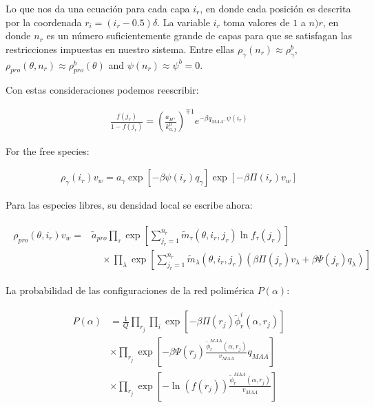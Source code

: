 Lo que nos da una ecuaci\'on para cada capa $i_r$, en donde cada posici\'on es descrita por la coordenada $r_i = (i_r -0.5)\delta$. 
La variable $i_r$ toma valores de $1$ a $n)r$, en donde $n_r$ es un n\'umero suficientemente grande de capas para que se satisfagan las restricciones impuestas en nuestro sistema. Entre ellas
 $\rho_\gamma(n_r) \approx \rho_\gamma^b$, $\rho_{pro}(\theta,n_r) \approx \rho_{pro}^b(\theta)$ and $\psi(n_r) \approx \psi^b = 0$.

Con estas consideraciones podemos reescribir:


\begin{align}
	\frac{f(j_r)}{1-f(j_r)}= \left(\frac{a_{H^+}}{k^0_{a,j}}\right)^{\mp 1} e^{-\beta q_{MAA^-}\psi(i_r)}
\end{align}


For the free species:

\begin{align}
	\rho_\gamma(i_r)v_w = a_\gamma \exp{[-\beta \psi(i_r)q_\gamma]} \exp{[-\beta\Pi(i_r) v_w]}
\end{align}

Para las especies libres, su densidad local se escribe ahora:

\begin{align}
	\begin{aligned}
		\rho_{pro}(\theta, i_r)v_w = &\tilde{a}_{pro} \prod_\tau\exp\left[ \sum^{n_r}_{j_r = 1} \tilde{m}_\tau(\theta,i_r,j_r) \ln f_\tau(j_r)\right] \\
		& \hspace{1em} \times \prod_\lambda \exp \left[ \sum^{n_r}_{j_r = 1} \tilde{m}_\lambda(\theta,i_r, j_r)\left(\beta\Pi(j_r) v_\lambda+ \beta \Psi(j_r)q_\lambda\right) \right]
	\end{aligned}
\end{align}

La probabilidad de las configuraciones de la red polim\'erica $P(\alpha)$: 

\begin{align}
	\begin{aligned}
		P(\alpha)&= \frac{1}{Q}\prod_{r_j}\prod_i \exp\left[{- {\beta\Pi(r_j) \tilde{\phi}^i_r(\alpha,r_j)}}\right] \\
		& \times \prod_{r_j} \exp \left[ - \beta \Psi(r_j)\frac{\tilde{ \phi}^{MAA}_r(\alpha,r_j)}{v_{MAA}} q_{MAA}  \right] \\
		& \times \prod_{r_j} \exp\left[ - { \ln(f(r_j))\frac{\tilde{ \phi}^{MAA}_r(\alpha,r_j)}{v_{MAA}}}\right] \\
	\end{aligned}
\end{align}

